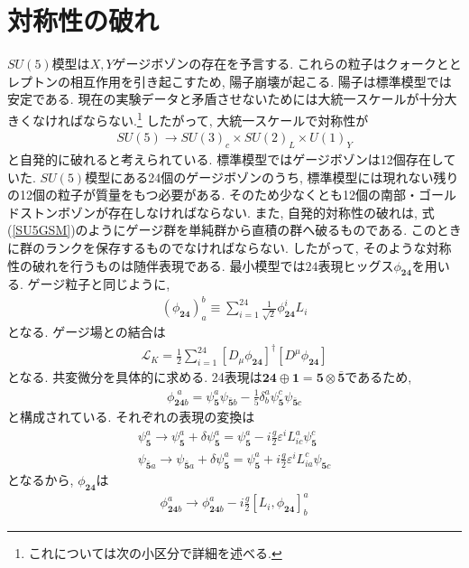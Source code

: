 \section{対称性の破れ}
$SU(5)$模型は$X, Y$ゲージボゾンの存在を予言する.
これらの粒子はクォークととレプトンの相互作用を引き起こすため, 陽子崩壊が起こる.
陽子は標準模型では安定である.
現在の実験データと矛盾させないためには大統一スケールが十分大きくなければならない.\footnote{これについては次の小区分で詳細を述べる.}
したがって, 大統一スケールで対称性が
\begin{align}
  SU(5)\rightarrow SU(3)_c\times SU(2)_L\times U(1)_Y\label{SU5GSM}
\end{align}
と自発的に破れると考えられている.
標準模型ではゲージボゾンは12個存在していた.
$SU(5)$模型にある24個のゲージボゾンのうち, 標準模型には現れない残りの12個の粒子が質量をもつ必要がある.
そのため少なくとも12個の南部・ゴールドストンボゾンが存在しなければならない.
また, 自発的対称性の破れは, 式(\ref{SU5GSM})のようにゲージ群を単純群から直積の群へ破るものである.
このときに群のランクを保存するものでなければならない.
したがって, そのような対称性の破れを行うものは随伴表現である.
最小模型では$24$表現ヒッグス$\phi_{\bm{24}}$を用いる.
ゲージ粒子と同じように, 
\begin{align}
  (\phi_{\bm{24}})_a^b \equiv \sum_{i=1}^{24}\frac{1}{\sqrt{2}}\phi_{\bm{24}}^i L_i
\end{align}
となる.
ゲージ場との結合は
\begin{align}
\mathcal{L}_K = \frac{1}{2}\sum_{i=1}^{24}[D_\mu\phi_{\bm{24}}]^\dagger [D^\mu\phi_{\bm{24}}]\nonumber
\end{align}
となる.
共変微分を具体的に求める.
24表現は$\bm{24}\oplus \bm{1} = \bm{5}\otimes \bar{\bm{5}}$であるため,
\begin{align}
  \phi_{\bm{24}b}^{\,\,a} = \psi_{\bm{5}}^a \psi_{\bm{\bar{5}}b} -\frac{1}{5}\delta^a_b \psi^c_{\bm{5}}\psi_{\bm{\bar{5}}c}
\end{align}
と構成されている.
それぞれの表現の変換は
\begin{align}
  \psi_{\bm{5}}^a \rightarrow \psi^a_{\bm{5}}+\delta \psi_{\bm{5}}^a = \psi_{\bm{5}}^a -i\frac{g}{2}\varepsilon^i L^a_{ic}\psi_{\bm{5}}^c \nonumber\\
  \psi_{\bm{\bar{5}}a} \rightarrow \psi_{\bm{\bar{5}}a}+\delta \psi_{\bm{5}}^a = \psi_{\bm{5}}^a +i\frac{g}{2}\varepsilon^i L^c_{ia}\psi_{\bm{5}c}\nonumber
\end{align}
となるから, $\phi_{\bm{24}}$は
\begin{align}
  \phi_{\bm{24}b}^a \rightarrow \phi_{\bm{24}b}^a -i\frac{g}{2}[L_i,\phi_{\bm{24}}]^a_b
\end{align}
